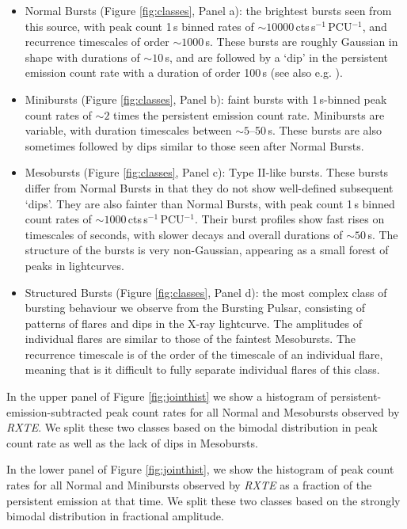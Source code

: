\begin{itemize}
\item Normal Bursts (Figure \ref{fig:classes}, Panel a): the brightest bursts seen from this source, with peak count 1\,s binned rates of $\sim10000$\,cts\,s$^{-1}$\,PCU$^{-1}$, and recurrence timescales of order $\sim1000$\,s.  These bursts are roughly Gaussian in shape with durations of $\sim10$\,s, and are followed by a `dip' in the persistent emission count rate with a duration of order 100\,s (see also e.g. \citealp{Giles_BP}).
\item Minibursts (Figure \ref{fig:classes}, Panel b): faint bursts with 1\,s-binned peak count rates of $\sim2$ times the persistent emission count rate.  Minibursts are variable, with duration timescales between $\sim5$--50\,s.  These bursts are also sometimes followed by dips similar to those seen after Normal Bursts.
\item Mesobursts (Figure \ref{fig:classes}, Panel c): Type II-like bursts.  These bursts differ from Normal Bursts in that they do not show well-defined subsequent `dips'.  They are also fainter than Normal Bursts, with peak count 1\,s binned count rates of $\sim1000$\,cts\,s$^{-1}$\,PCU$^{-1}$.  Their burst profiles show fast rises on timescales of seconds, with slower decays and overall durations of $\sim50$\,s.  The structure of the bursts is very non-Gaussian, appearing as a small forest of peaks in lightcurves.
\item Structured Bursts (Figure \ref{fig:classes}, Panel d): the most complex class of bursting behaviour we observe from the Bursting Pulsar, consisting of patterns of flares and dips in the X-ray lightcurve.  The amplitudes of individual flares are similar to those of the faintest Mesobursts.  The recurrence timescale is of the order of the timescale of an individual flare, meaning that is it difficult to fully separate individual flares of this class.
\end{itemize}

\par In the upper panel of Figure \ref{fig:jointhist} we show a histogram of persistent-emission-subtracted peak count rates for all Normal and Mesobursts observed by \textit{RXTE}.  We split these two classes based on the bimodal distribution in peak count rate as well as the lack of dips in Mesobursts.
\par In the lower panel of Figure \ref{fig:jointhist}, we show the histogram of peak count rates for all Normal and Minibursts observed by \textit{RXTE} as a fraction of the persistent emission at that time.  We split these two classes based on the strongly bimodal distribution in fractional amplitude.

